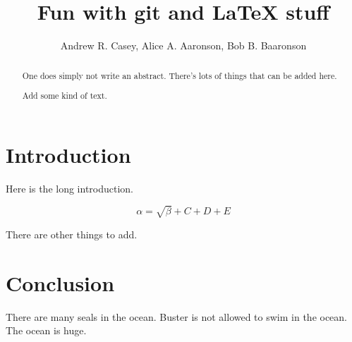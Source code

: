 \documentclass{article}
\begin{document}
\title{Fun with git and \LaTeX{} stuff}
\author{Andrew R. Casey, Alice A. Aaronson, Bob B. Baaronson}

\maketitle

\begin{abstract}
One does simply not write an abstract. There's lots of things that can be added here.

Add some kind of text.
\end{abstract}

\section{Introduction}
Here is the long introduction.

\begin{equation}
    \label{simple_equation}
    \alpha = \sqrt{ \beta } + C + D + E
\end{equation}

There are other things to add.

\section{Conclusion}
There are many seals in the ocean. Buster is not allowed to swim in the ocean. The ocean is huge.
\end{document}
